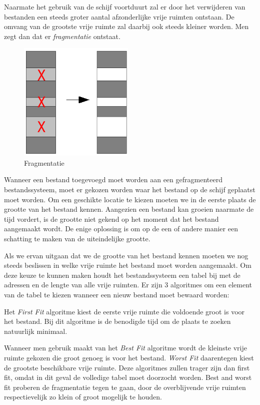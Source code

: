 Naarmate het gebruik van de schijf voortduurt zal er door het
verwijderen van bestanden een steeds groter aantal afzonderlijke vrije
ruimten ontstaan. De omvang van de grootste vrije ruimte zal daarbij ook
steeds kleiner worden. Men zegt dan dat er
\emph{fragmentatie} ontstaat.

\begin{figure}
\begin{center}
\includegraphics[width=55mm]{images/fig0406.png}
\caption{Fragmentatie}
\end{center}
\end{figure}

Wanneer een bestand toegevoegd moet worden aan een gefragmenteerd
bestandssysteem, moet er gekozen worden waar het bestand op de schijf
geplaatst moet worden. Om een geschikte locatie te kiezen moeten we in
de eerste plaats de grootte van het bestand kennen. Aangezien een
bestand kan groeien naarmate de tijd vordert, is de grootte niet gekend
op het moment dat het bestand aangemaakt wordt. De enige oplossing is om
op de een of andere manier een schatting te maken van de uiteindelijke
grootte.

Als we ervan uitgaan dat we de grootte van het bestand kennen
moeten we nog steeds beslissen in welke vrije ruimte het bestand moet
worden aangemaakt. Om deze keuze te kunnen maken houdt het
bestandssysteem een tabel bij met de adressen en de lengte van alle
vrije ruimten. Er zijn 3 algoritmes om een element van de tabel te
kiezen wanneer een nieuw bestand moet bewaard worden:

Het \emph{First Fit} algoritme kiest de eerste
vrije ruimte die voldoende groot is voor het bestand. Bij dit algoritme
is de benodigde tijd om de plaats te zoeken natuurlijk minimaal.

Wanneer men gebruik maakt van het \emph{Best Fit}
algoritme wordt de kleinste vrije ruimte gekozen die groot genoeg is
voor het bestand. \emph{Worst Fit} daarentegen kiest de
grootste beschikbare vrije ruimte. Deze algoritmes zullen trager zijn
dan first fit, omdat in dit geval de volledige tabel moet doorzocht
worden. Best and worst fit proberen de fragmentatie tegen te gaan, door
de overblijvende vrije ruimten respectievelijk zo klein of groot
mogelijk te houden.

